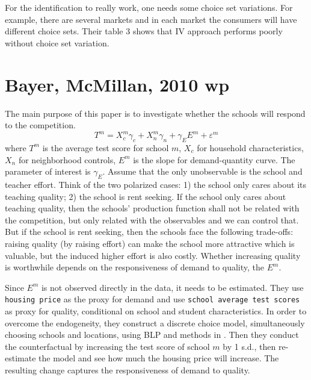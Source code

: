For the identification to really work, one needs some choice set variations. 
For example, there are several markets and in each market the consumers will have different choice sets.
Their table 3 shows that IV approach performs poorly without choice set variation.



\section{Bayer, McMillan, 2010 wp} %
\label{sec:bayer_mcmillan_2010_wp}

\textbf{}

The main purpose of this paper is to investigate whether the schools will respond to the competition. 
\[
    T^{m}=X_{c}^{m} \gamma_{c}+X_{n}^{m} \gamma_{n}+\gamma_{E} E^{m}+\varepsilon^{m}
\]
where $T^m$ is the average test score for school $m$, $X_c$ for household characteristics, $X_n$ for neighborhood controls, $E^m$ is the slope for demand-quantity curve.
The parameter of interest is $\gamma_E$.
Assume that the only unobservable is the school and teacher effort.
Think of the two polarized cases:
1) the school only cares about its teaching quality;
2) the school is rent seeking.
If the school only cares about teaching quality, then the schools' production function shall not be related with the competition, but only related with the observables and we can control that. 
But if the school is rent seeking, then the schools face the following trade-offs: raising quality (by raising effort) can make the school more attractive which is valuable, but the induced higher effort is also costly.
Whether increasing quality is worthwhile depends on the responsiveness of demand to quality, the $E^m$.

Since $E^m$ is not observed directly in the data, it needs to be estimated.
They use \texttt{housing price} as the proxy for demand and use \texttt{school average test scores} as proxy for quality, conditional on school and student characteristics.
In order to overcome the endogeneity, they construct a discrete choice model, simultaneously choosing schools and locations, using BLP and methods in \textcite{BayerFerreiraMcMillan2007}.
Then they conduct the counterfactual by increasing the test score of school $m$ by 1 s.d., then re-estimate the model and see how much the housing price will increase.
The resulting change captures the responsiveness of demand to quality.



